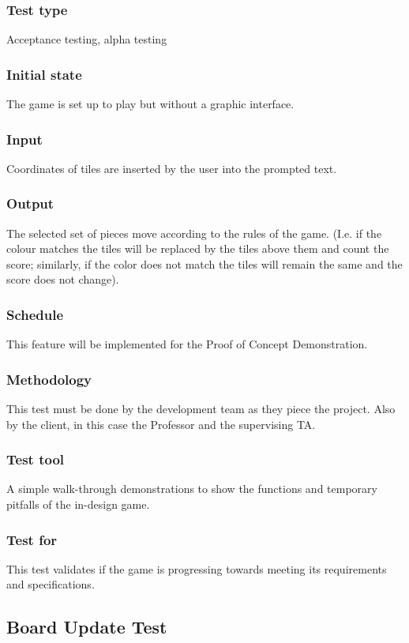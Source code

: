\documentclass[12pt]{article}
\begin{document}
\subsubsection{Test type}
Acceptance testing, alpha testing
\subsubsection{Initial state}
The game is set up to play but without a graphic interface. 
\subsubsection{Input}
Coordinates of tiles are inserted by the user into the prompted text.
\subsubsection{Output}
The selected set of pieces move according to the rules of the game. (I.e. if the colour matches the tiles will be replaced by the tiles above them and count the score; similarly, if the color does not match the tiles will remain the same and the score does not change).
\subsubsection{Schedule}
This feature will be implemented for the Proof of Concept Demonstration.
\subsubsection{Methodology}
This test must be done by the development team as they piece the project. Also by the client, in this case the Professor and the supervising TA. 
\subsubsection{Test tool}
A simple walk-through demonstrations to show the functions and temporary pitfalls of the in-design game.
\subsubsection{Test for}
This test validates if the game is progressing towards meeting its requirements and specifications.

\newpage

\subsection{Board Update Test}
\end{document}
